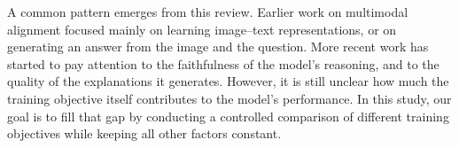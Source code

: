 A common pattern emerges from this review.
Earlier work on multimodal alignment focused mainly on learning image--text representations, or on generating an answer from the image and the question.
More recent work has started to pay attention to the faithfulness of the model's reasoning, and to the quality of the explanations it generates.
However, it is still unclear how much the training objective itself contributes to the model's performance.
In this study, our goal is to fill that gap by conducting a controlled comparison of different training objectives while keeping all other factors constant.
